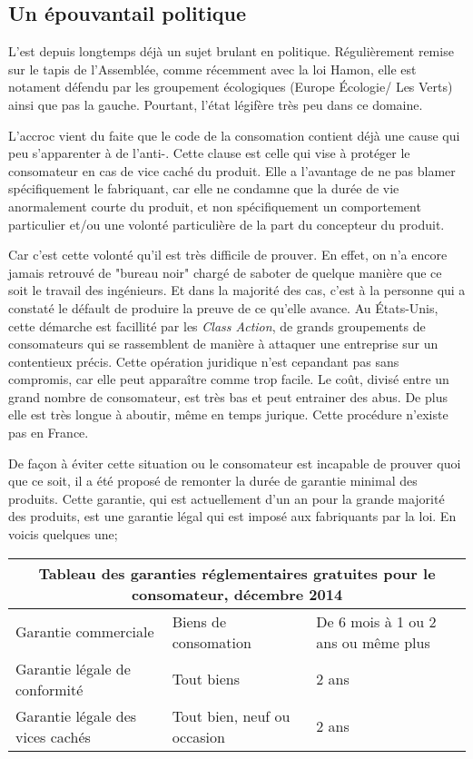 \subsection{Un épouvantail politique}
L'\op est depuis longtemps déjà un sujet brulant en politique. Régulièrement remise sur le tapis de l'Assemblée, comme récemment avec la loi Hamon, elle est notament défendu par les groupement écologiques (Europe Écologie/ Les Verts) ainsi que pas la gauche.
Pourtant, l'état légifère très peu dans ce domaine.

\smallbreak L'accroc vient du faite que le code de la consomation contient déjà une cause qui peu s'apparenter à de l'anti-\op.
Cette clause est celle qui vise à protéger le consomateur en cas de vice caché du produit. 
Elle a l'avantage de ne pas blamer spécifiquement le fabriquant, car elle ne condamne que la durée de vie anormalement courte du produit, et non spécifiquement un comportement particulier et/ou une volonté particulière de la part du concepteur du produit.

\smallbreak Car c'est cette volonté qu'il est très difficile de prouver. En effet, on n'a encore jamais retrouvé de "bureau noir" chargé de saboter de quelque manière que ce soit le travail des ingénieurs. Et dans la majorité des cas, c'est à la personne qui a constaté le défault de produire la preuve de ce qu'elle avance.
Au États-Unis, cette démarche est facillité par les \textit{Class Action}, de grands groupements de consomateurs qui se rassemblent de manière à attaquer une entreprise sur un contentieux précis. Cette opération juridique n'est cepandant pas sans compromis, car elle peut apparaître comme trop facile.
Le coût, divisé entre un grand nombre de consomateur, est très bas et peut entrainer des abus.
De plus elle est très longue à aboutir, même en temps jurique.
Cette procédure n'existe pas en France.

\smallbreak De façon à éviter cette situation ou le consomateur est incapable de prouver quoi que ce soit, il a été proposé de remonter la durée de garantie minimal des produits. Cette garantie, qui est actuellement d'un an pour la grande majorité des produits, est une garantie légal qui est imposé aux fabriquants par la loi. 
En voicis quelques une;

\begin{center}
\begin{tabular}{|l|l|l|}
  \hline
  \multicolumn{3}{|c|}{Tableau des garanties réglementaires gratuites pour le consomateur, décembre 2014} \\
	\hline Garantie commerciale & Biens de consomation & De 6 mois à 1 ou 2 ans ou même plus\\
	       Garantie légale de conformité & Tout biens & 2 ans \\
	       Garantie légale des vices cachés & Tout bien, neuf ou occasion & 2 ans \\
	\hline
\end{tabular}
\end{center}

